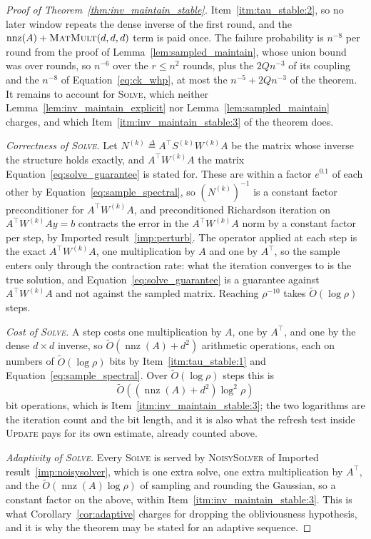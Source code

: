 \documentclass[11pt]{article}
\newcommand{\nnz}{\operatorname{nnz}}
\newcommand{\MM}{\textsc{MatMult}}
\renewcommand{\O}{\widetilde O}
\newcommand{\defeq}{\stackrel{\Delta}{=}}
\begin{document}
\begin{proof}[Proof of Theorem~\ref{thm:inv_maintain_stable}]
Item~\ref{itm:tau_stable:2}, so no later window repeats the dense inverse of the
first round, and the $\nnz(A) + \MM(d, d, d)$ term is paid once.
The failure probability is $n^{-8}$ per round from the proof of
Lemma~\ref{lem:sampled_maintain}, whose union bound was over rounds, so $n^{-6}$
over the $r \le n^{2}$ rounds, plus the
$2 Q n^{-3}$ of its coupling and the
$n^{-8}$ of Equation~\eqref{eq:ck_whp}, at most the
$n^{-5} + 2 Q n^{-3}$ of the theorem.
It remains to account for \textsc{Solve}, which neither
Lemma~\ref{lem:inv_maintain_explicit} nor Lemma~\ref{lem:sampled_maintain}
charges, and which Item~\ref{itm:inv_maintain_stable:3} of the theorem does.

\emph{Correctness of \textsc{Solve}.}
Let $N^{(k)} \defeq A^\top S^{(k)} W^{(k)} A$ be the matrix whose inverse the
structure holds exactly, and $A^\top W^{(k)} A$ the matrix
Equation~\eqref{eq:solve_guarantee} is stated for.
These are within a factor $e^{0.1}$ of each other by
Equation~\eqref{eq:sample_spectral}, so $(N^{(k)})^{-1}$ is a constant factor
preconditioner for $A^\top W^{(k)} A$, and preconditioned Richardson iteration
on $A^\top W^{(k)} A y = b$ contracts the error in the
$A^\top W^{(k)} A$ norm by a constant factor per step, by Imported
result~\ref{imp:perturb}.
The operator applied at each step is the exact $A^\top W^{(k)} A$, one
multiplication by $A$ and one by
$A^\top$, so the sample enters only through the contraction rate: what the
iteration converges to is the true solution, and
Equation~\eqref{eq:solve_guarantee} is a guarantee against $A^\top W^{(k)} A$
and not against the sampled matrix.
Reaching $\rho^{-10}$ takes
$\O(\log \rho)$ steps.

\emph{Cost of \textsc{Solve}.}
A step costs one multiplication by $A$, one by
$A^\top$, and one by the dense
$d \times d$ inverse, so
$\O(\nnz(A) + d^{2})$ arithmetic operations, each on numbers of
$\O(\log \rho)$ bits by Item~\ref{itm:tau_stable:1} and
Equation~\eqref{eq:sample_spectral}.
Over $\O(\log \rho)$ steps this is
\[
\O\left( \left( \nnz(A) + d^{2} \right) \log^{2} \rho \right)
\]
bit operations, which is Item~\ref{itm:inv_maintain_stable:3}; the two
logarithms are the iteration count and the bit length, and it is also what the
refresh test inside \textsc{Update} pays for its own estimate, already counted
above.

\emph{Adaptivity of \textsc{Solve}.}
Every \textsc{Solve} is served by \textsc{NoisySolver} of Imported
result~\ref{imp:noisysolver}, which is one extra solve, one extra multiplication
by $A^\top$, and the
$\O(\nnz(A) \log \rho)$ of sampling and rounding the Gaussian, so a constant
factor on the above, within Item~\ref{itm:inv_maintain_stable:3}.
This is what Corollary~\ref{cor:adaptive} charges for dropping the obliviousness
hypothesis, and it is why the theorem may be stated for an adaptive sequence.
\end{proof}
\end{document}
